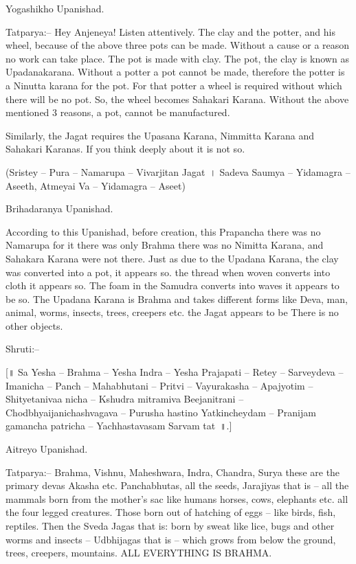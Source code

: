Yogashikho Upanishad.

Tatparya:– Hey Anjeneya! Listen attentively. The clay and the potter, and his wheel, because of the above three pots can be made. Without a cause or a reason no work can take place. The pot is made with clay. The pot, the clay is known as Upadanakarana. Without a potter a pot cannot be made, therefore the potter is a Ninutta karana for the pot. For that potter a wheel is required without which there will be no pot. So, the wheel becomes Sahakari Karana. Without the above mentioned 3 reasons, a pot, cannot be manufactured.

Similarly, the Jagat requires the Upasana Karana, Nimmitta Karana and Sahakari Karanas. If you think deeply about it is not so.

(Sristey – Pura – Namarupa – Vivarjitan Jagat~। Sadeva Saumya – Yidamagra – Aseeth, Atmeyai Va – Yidamagra – Aseet)

Brihadaranya Upanishad.

According to this Upanishad, before creation, this Prapancha there was no Namarupa for it there was only Brahma there was no Nimitta Karana, and Sahakara Karana were not there. Just as due to the Upadana Karana, the clay was converted into a pot, it appears so. the thread when woven converts into cloth it appears so. The foam in the Samudra converts into waves it appears to be so. The Upadana Karana is Brahma and takes different forms like Deva, man, animal, worms, insects, trees, creepers etc. the Jagat appears to be There is no other objects.

Shruti:–

[॥ Sa Yesha – Brahma – Yesha Indra – Yesha Prajapati – Retey – Sarveydeva – Imanicha – Panch – Mahabhutani – Pritvi – Vayurakasha – Apajyotim – Shityetanivaa nicha – Kshudra mitramiva Beejanitrani – Chodbhyaijanichashvagava – Purusha hastino Yatkincheydam – Pranijam gamancha patricha – Yachhastavasam Sarvam tat~॥.]

Aitreyo Upanishad.

Tatparya:– Brahma, Vishnu, Maheshwara, Indra, Chandra, Surya these are the primary devas Akasha etc. Panchabhutas, all the seeds, Jarajiyas that is – all the mammals born from the mother's sac like humans horses, cows, elephants etc. all the four legged creatures. Those born out of hatching of eggs – like birds, fish, reptiles. Then the Sveda Jagas that is: born by sweat like lice, bugs and other worms and insects – Udbhijagas that is – which grows from below the ground, trees, creepers, mountains. ALL EVERYTHING IS BRAHMA.

